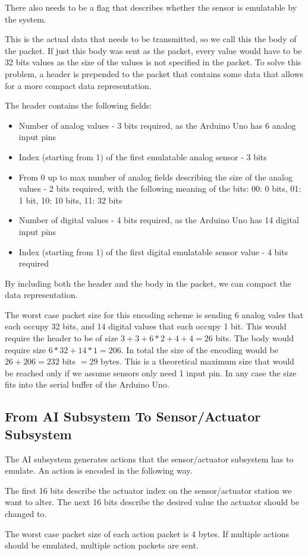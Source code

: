 There also needs to be a flag that describes whether the sensor is emulatable by the system.

This is the actual data that needs to be transmitted, so we call this the body of the packet. If just this body was sent as the packet, every value would have to be 32 bits values as the size of the values is not specified in the packet. To solve this problem, a header is prepended to the packet that contains some data that allows for a more compact data representation.

The header contains the following fields:

\begin{itemize}
\item Number of analog values - 3 bits required, as the Arduino Uno has 6 analog input pins
\item Index (starting from 1) of the first emulatable analog sensor - 3 bits
\item From 0 up to max number of analog fields describing the size of the analog values - 2 bits required, with the following meaning of the bits: 00: 0 bits, 01: 1 bit, 10: 10 bits, 11: 32 bits
\item Number of digital values - 4 bits required, as the Arduino Uno has 14 digital input pins
\item Index (starting from 1) of the first digital emulatable sensor value - 4 bits required
\end{itemize}

By including both the header and the body in the packet, we can compact the data representation.

The worst case packet size for this encoding scheme is sending 6 analog vales that each occupy 32 bits, and 14 digital values that each occupy 1 bit. This would require the header to be of size $3 + 3 + 6 * 2 + 4 + 4 = 26$ bits. The body would require size $6 * 32 + 14 * 1 = 206$. In total the size of the encoding would be $26 + 206 = 232$ bits $= 29$ bytes. This is a theoretical maximum size that would be reached only if we assume sensors only need 1 input pin. In any case the size fits into the serial buffer of the Arduino Uno.

\subsection{From  AI Subsystem To Sensor/Actuator Subsystem}

The AI subsystem generates actions that the sensor/actuator subsystem has to emulate. An action is encoded in the following way.

The first 16 bits describe the actuator index on the sensor/actuator station we want to alter. The next 16 bits describe the desired value the actuator should be changed to.

The worst case packet size of each action packet is 4 bytes. If multiple actions should be emulated, multiple action packets are sent.
